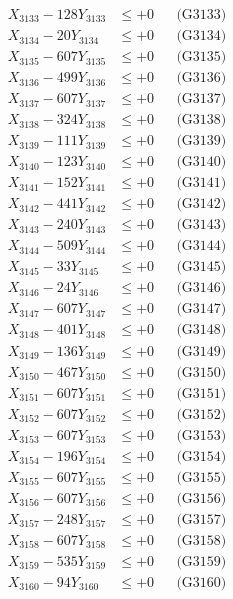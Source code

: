 \documentclass[a4paper,10pt]{article}
\begin{document}
{\begin{align}
X_{3133} - 128Y_{3133} &\leq +0 && \text{(G3133)} \\
X_{3134} - 20Y_{3134} &\leq +0 && \text{(G3134)} \\
X_{3135} - 607Y_{3135} &\leq +0 && \text{(G3135)} \\
X_{3136} - 499Y_{3136} &\leq +0 && \text{(G3136)} \\
X_{3137} - 607Y_{3137} &\leq +0 && \text{(G3137)} \\
X_{3138} - 324Y_{3138} &\leq +0 && \text{(G3138)} \\
X_{3139} - 111Y_{3139} &\leq +0 && \text{(G3139)} \\
X_{3140} - 123Y_{3140} &\leq +0 && \text{(G3140)} \\
\allowbreak
X_{3141} - 152Y_{3141} &\leq +0 && \text{(G3141)} \\
X_{3142} - 441Y_{3142} &\leq +0 && \text{(G3142)} \\
X_{3143} - 240Y_{3143} &\leq +0 && \text{(G3143)} \\
X_{3144} - 509Y_{3144} &\leq +0 && \text{(G3144)} \\
X_{3145} - 33Y_{3145} &\leq +0 && \text{(G3145)} \\
X_{3146} - 24Y_{3146} &\leq +0 && \text{(G3146)} \\
X_{3147} - 607Y_{3147} &\leq +0 && \text{(G3147)} \\
X_{3148} - 401Y_{3148} &\leq +0 && \text{(G3148)} \\
X_{3149} - 136Y_{3149} &\leq +0 && \text{(G3149)} \\
X_{3150} - 467Y_{3150} &\leq +0 && \text{(G3150)} \\
\allowbreak
X_{3151} - 607Y_{3151} &\leq +0 && \text{(G3151)} \\
X_{3152} - 607Y_{3152} &\leq +0 && \text{(G3152)} \\
X_{3153} - 607Y_{3153} &\leq +0 && \text{(G3153)} \\
X_{3154} - 196Y_{3154} &\leq +0 && \text{(G3154)} \\
X_{3155} - 607Y_{3155} &\leq +0 && \text{(G3155)} \\
X_{3156} - 607Y_{3156} &\leq +0 && \text{(G3156)} \\
X_{3157} - 248Y_{3157} &\leq +0 && \text{(G3157)} \\
X_{3158} - 607Y_{3158} &\leq +0 && \text{(G3158)} \\
X_{3159} - 535Y_{3159} &\leq +0 && \text{(G3159)} \\
X_{3160} - 94Y_{3160} &\leq +0 && \text{(G3160)} \\

\end{align}}
\end{document}
